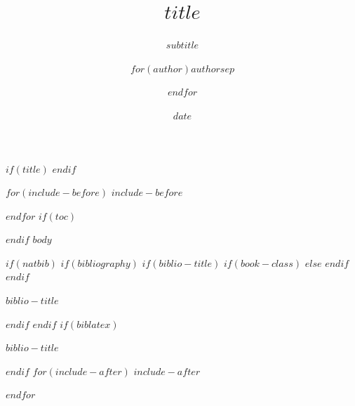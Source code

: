 \documentclass[$if(fontsize)$$fontsize$,$endif$$if(handout)$handout,$endif$$if(beamer)$ignorenonframetext,$endif$$for(classoption)$$classoption$$sep$,$endfor$]{$documentclass$}
\title{$title$}
\subtitle{$subtitle$}
\author{$for(author)$$author$$sep$ \and $endfor$}
\date{$date$}
\begin{document}
$if(title)$
\frame{\titlepage}
$endif$

$for(include-before)$
$include-before$

$endfor$
$if(toc)$
\begin{frame}
\tableofcontents[hideallsubsections]
\end{frame}

$endif$
$body$

$if(natbib)$
$if(bibliography)$
$if(biblio-title)$
$if(book-class)$
\renewcommand\bibname{$biblio-title$}
$else$
\renewcommand\refname{$biblio-title$}
$endif$
$endif$
\begin{frame}[allowframebreaks]{$biblio-title$}

\end{frame}

$endif$
$endif$
$if(biblatex)$
\begin{frame}[allowframebreaks]{$biblio-title$}
\printbibliography[heading=none]
\end{frame}

$endif$
$for(include-after)$
$include-after$

$endfor$
\end{document}
